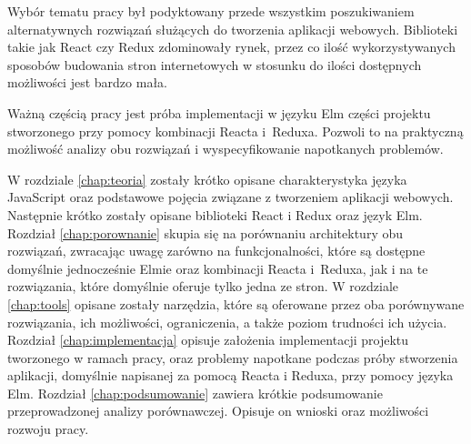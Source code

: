 Wybór tematu pracy był podyktowany przede wszystkim poszukiwaniem alternatywnych rozwiązań służących do tworzenia aplikacji webowych. Biblioteki takie jak React czy Redux zdominowały rynek, przez co ilość wykorzystywanych sposobów budowania stron internetowych w stosunku do ilości dostępnych możliwości jest bardzo mała.

Ważną częścią pracy jest próba implementacji w języku Elm części projektu stworzonego przy pomocy kombinacji Reacta i~Reduxa. Pozwoli to na praktyczną możliwość analizy obu rozwiązań i wyspecyfikowanie napotkanych problemów.

W rozdziale \ref{chap:teoria} zostały krótko opisane charakterystyka języka JavaScript oraz podstawowe pojęcia związane z tworzeniem aplikacji webowych. Następnie krótko zostały opisane biblioteki React i Redux oraz język Elm.
Rozdział \ref{chap:porownanie} skupia się na porównaniu architektury obu rozwiązań, zwracając uwagę zarówno na funkcjonalności, które są dostępne domyślnie jednocześnie Elmie oraz kombinacji Reacta i~Reduxa, jak i na te rozwiązania, które domyślnie oferuje tylko jedna ze stron.
W rozdziale \ref{chap:tools} opisane zostały narzędzia, które są oferowane przez oba porównywane rozwiązania, ich możliwości, ograniczenia, a także poziom trudności ich użycia.
Rozdział \ref{chap:implementacja} opisuje założenia implementacji projektu tworzonego w ramach pracy, oraz problemy napotkane podczas próby stworzenia aplikacji, domyślnie napisanej za pomocą Reacta i Reduxa, przy pomocy języka Elm.
Rozdział \ref{chap:podsumowanie} zawiera krótkie podsumowanie przeprowadzonej analizy porównawczej. Opisuje on wnioski oraz możliwości rozwoju pracy.
